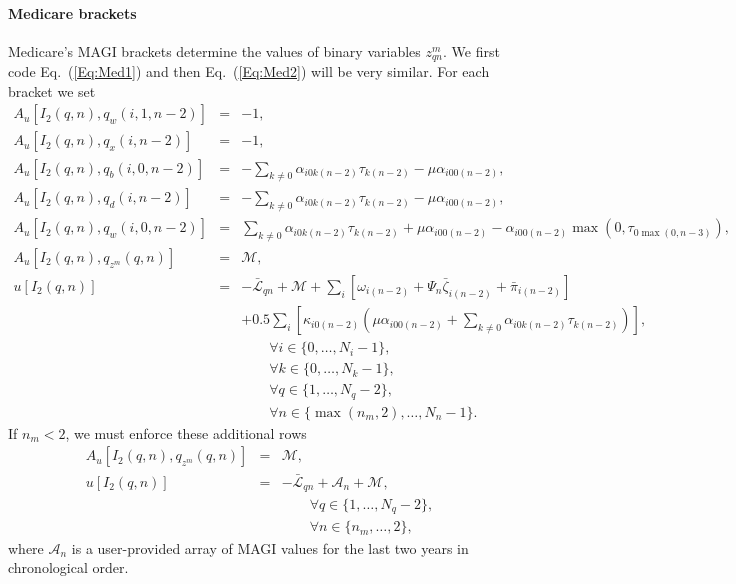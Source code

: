 \documentclass{report}[fleqn,12pt]
\begin{document}
\paragraph*{Medicare brackets}
Medicare's MAGI brackets determine the values of binary variables $z^m_{qn}$.
We first code Eq.~(\ref{Eq:Med1}) and then Eq.~(\ref{Eq:Med2}) will be very similar.
For each bracket we set
\begin{eqnarray}
	A_u[I_2(q, n), q_{w}(i, 1, n-2)] &=& -1, \nonumber \\
	A_u[I_2(q, n), q_{x}(i, n-2)] &=& -1, \nonumber \\
	A_u[I_2(q, n), q_{b}(i, 0, n-2)] &=&
	    -\sum_{k\neq 0} \alpha_{i0k(n-2)}\tau_{k(n-2)} - \mu \alpha_{i00(n-2)},
	    \nonumber \\
	A_u[I_2(q, n), q_{d}(i, n-2)] &=&
	    -\sum_{k\neq 0} \alpha_{i0k(n-2)}\tau_{k(n-2)} - \mu \alpha_{i00(n-2)},
	    \nonumber \\
	A_u[I_2(q, n), q_{w}(i, 0, n-2)] &=&
	    \sum_{k\neq 0} \alpha_{i0k(n-2)}\tau_{k(n-2)} + \mu \alpha_{i00(n-2)}
	    - \alpha_{i00(n-2)}\max(0, \tau_{0\max(0, n-3)}), \nonumber \\
	A_u[I_2(q, n), q_{z^m}(q, n)] &=& \mathcal{M}, \nonumber \\
	u[I_2(q, n)] &=& -\bar{\mathcal{L}}_{qn} + \mathcal{M}
         + \sum_i \left[\omega_{i(n-2)} + \Psi_n\bar{\zeta}_{i(n-2)} + \bar{\pi}_{i(n-2)} \right]\nonumber \\
	&& + 0.5 \sum_i \left[\kappa_{i0(n-2)}  \left(
	  \mu\alpha_{i00(n-2)} + \sum_{k\neq 0} \alpha_{i0k(n-2)}\tau_{k(n-2)}
	  \right)\right],\nonumber\\
	&&\qquad\forall i \in \{0,\ldots, N_i - 1\}, \nonumber\\
	&&\qquad\forall k \in \{0,\ldots, N_k - 1\}, \nonumber\\
	&&\qquad\forall q \in \{1,\ldots, N_q - 2\}, \nonumber\\
	&&\qquad\forall n \in \{\max(n_m, 2),\ldots, N_n - 1\}.
\end{eqnarray}
If $n_m < 2$, we must enforce these additional rows
\begin{eqnarray}
	A_u[I_2(q, n), q_{z^m}(q, n)] &=& \mathcal{M}, \nonumber \\
	u[I_2(q, n)] &=& -\bar{\mathcal{L}}_{qn} + \mathcal{A}_{n} + \mathcal{M}, \nonumber \\
	&&\qquad\forall q \in \{1,\ldots, N_q - 2\}, \nonumber\\
	&&\qquad\forall n \in \{n_m,\ldots, 2\},
\end{eqnarray}
where $\mathcal{A}_n$ is a user-provided array of MAGI values for the last two years in chronological order.
\end{document}
